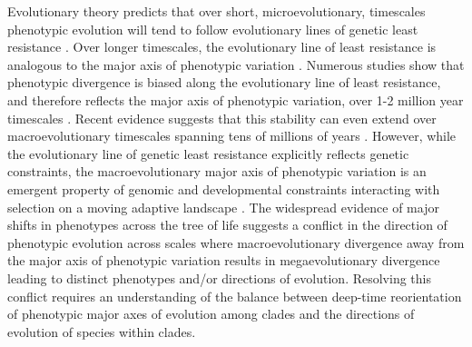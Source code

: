 \documentclass[12pt,letterpaper]{article}
\begin{document}
Evolutionary theory predicts that over short, microevolutionary, timescales phenotypic evolution will tend to follow evolutionary lines of genetic least resistance \cite{schluter1996adaptive,Rhoda2022}.
Over longer timescales, the evolutionary line of least resistance is analogous to the major axis of phenotypic variation \cite{marroig2005size,fasanelli2022allometry}.
Numerous studies show that phenotypic divergence is biased along the evolutionary line of least resistance, and therefore reflects the major axis of phenotypic variation, over 1-2 million year timescales \cite{marroig2005size, mcglothlin2018adaptive, tsuboi2018}.
Recent evidence suggests that this stability can even extend over macroevolutionary timescales spanning tens of millions of years \cite{mcglothlin2018adaptive}.
However, while the evolutionary line of genetic least resistance explicitly reflects genetic constraints, the macroevolutionary major axis of phenotypic variation is an emergent property of genomic and developmental constraints interacting with selection on a moving adaptive landscape \cite{BurinWhales,jones2004evolution}.
The widespread evidence of major shifts in phenotypes across the tree of life \cite{venditti2011multiple,pagel2022general,khabbazian2016fast,cooney2017mega,smaers2021evolution,goswami2022} suggests a conflict in the direction of phenotypic evolution across scales where macroevolutionary divergence away from the major axis of phenotypic variation results in megaevolutionary divergence leading to distinct phenotypes and/or directions of evolution.
Resolving this conflict requires an understanding of the balance between deep-time reorientation of phenotypic major axes of evolution among clades and the directions of evolution of species within clades.
\end{document}
